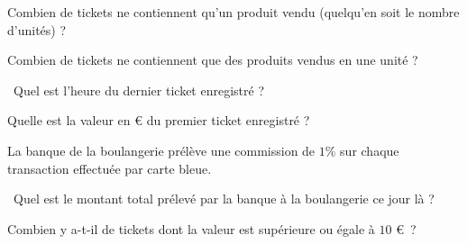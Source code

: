 \medskip{}

\question{} Combien de tickets ne contiennent qu'un produit vendu (quelqu'en soit le nombre d'unités) ?

\medskip{}

\question{} Combien de tickets ne contiennent que des produits vendus en une unité ? 

\medskip{}

\question{} Quel est l'heure du dernier ticket enregistré ? 

\medskip{}

\question{} Quelle est la valeur en € du premier ticket enregistré ? 

\medskip{}

La banque de la boulangerie prélève une commission de $1\%$ sur chaque transaction effectuée par carte bleue. 

\question{} Quel est le montant total prélevé par la banque à la boulangerie ce jour là ? 

\medskip{}

\question{} Combien y a-t-il de tickets dont la valeur est supérieure ou égale à $10$ € ? 
